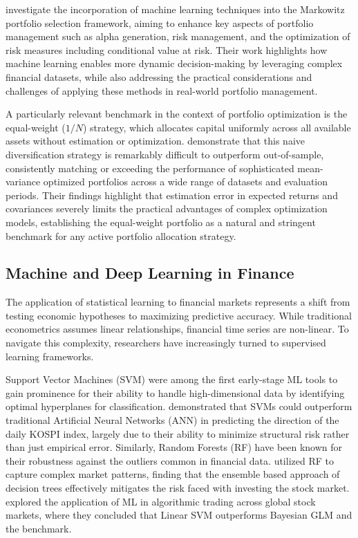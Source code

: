\documentclass[]{elsarticle}
\begin{document}
\citet{lopez2025enhancing} investigate the incorporation of machine learning techniques into the Markowitz portfolio selection framework, aiming to enhance key aspects of portfolio management such as alpha generation, risk management, and the optimization of risk measures including conditional value at risk. Their work highlights how machine learning enables more dynamic decision-making by leveraging complex financial datasets, while also addressing the practical considerations and challenges of applying these methods in real-world portfolio management.

A particularly relevant benchmark in the context of portfolio optimization is the equal-weight ($1/N$) strategy, which allocates capital uniformly across all available assets without estimation or optimization. \citet{DE_MIGEUL} demonstrate that this naive diversification strategy is remarkably difficult to outperform out-of-sample, consistently matching or exceeding the performance of sophisticated mean-variance optimized portfolios across a wide range of datasets and evaluation periods. Their findings highlight that estimation error in expected returns and covariances severely limits the practical advantages of complex optimization models, establishing the equal-weight portfolio as a natural and stringent benchmark for any active portfolio allocation strategy.

\hypertarget{machine-learning-in-finance}{%
\subsection{Machine and Deep Learning in Finance}\label{machine-learning-in-finance}}

The application of statistical learning to financial markets represents a shift from testing economic hypotheses to maximizing predictive accuracy. While traditional econometrics assumes linear relationships, financial time series are non-linear. To navigate this complexity, researchers have increasingly turned to supervised learning frameworks.

Support Vector Machines (SVM) were among the first early-stage ML tools to gain prominence for their ability to handle high-dimensional data by identifying optimal hyperplanes for classification. \citet{Kim2003} demonstrated that SVMs could outperform traditional Artificial Neural Networks (ANN) in predicting the direction of the daily KOSPI index, largely due to their ability to minimize structural risk rather than just empirical error. Similarly, Random Forests (RF) have been known for their robustness against the outliers common in financial data. \citet{Khaidem2016} utilized RF to capture complex market patterns, finding that the ensemble based approach of decision trees effectively mitigates the risk faced with investing the stock market. \citet{Grudniewicz_Slepaczuk_2023} explored the application of ML in algorithmic trading across global stock markets, where they concluded that Linear SVM outperforms Bayesian GLM and the benchmark.
\end{document}
